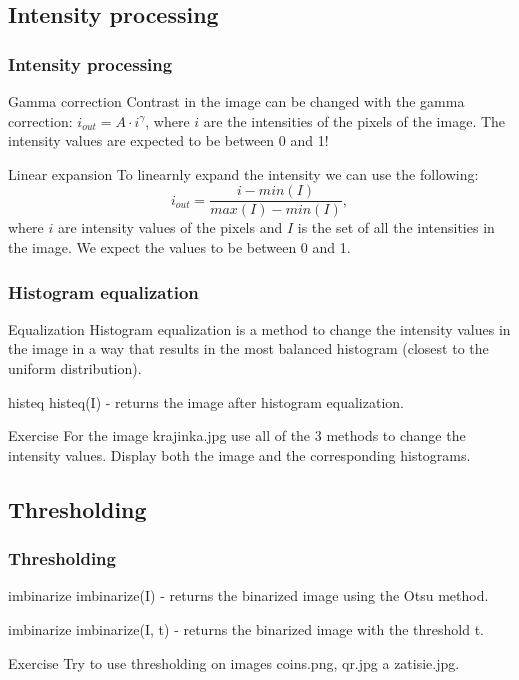 \documentclass{beamer}
\begin{document}
\subsection{Intensity processing}
\begin{frame}
\frametitle{Intensity processing}
\begin{block}{Gamma correction}
Contrast in the image can be changed with the gamma correction: $i_{out} = A \cdot i^{\gamma}$, where $i$ are the intensities of the pixels of the image. The intensity values are expected to be between 0 and 1!
\end{block}

\begin{block}{Linear expansion}
To linearnly expand the intensity we can use the following:
\begin{equation*}
i_{out} = \frac{i - min(I)}{max(I) - min(I)},\end{equation*}
where $i$ are intensity values of the pixels and $I$ is the set of all the intensities in the image. We expect the values to be between 0 and 1.
\end{block}
\end{frame}

\begin{frame}
\frametitle{Histogram equalization}
\begin{block}{Equalization}
Histogram equalization is a method to change the intensity values in the image in a way that results in the most balanced histogram (closest to the uniform distribution).
\end{block}

\begin{block}{histeq}
histeq(I) - returns the image after histogram equalization.
\end{block}

\begin{block}{Exercise}
For the image krajinka.jpg use all of the 3 methods to change the intensity values. Display both the image and the corresponding histograms.
\end{block}
\end{frame}

\subsection{Thresholding}
\begin{frame}
\frametitle{Thresholding}
\begin{block}{imbinarize}
imbinarize(I) - returns the binarized image using the Otsu method.
\end{block}

\begin{block}{imbinarize}
imbinarize(I, t) - returns the binarized image with the threshold t.
\end{block}

\begin{block}{Exercise}
Try to use thresholding on images coins.png, qr.jpg a zatisie.jpg.
\end{block}
\end{frame}
\end{document}
